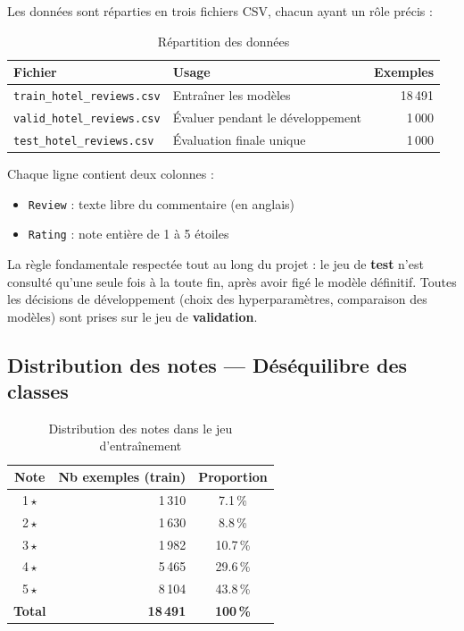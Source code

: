 \documentclass[12pt, a4paper]{article}
\begin{document}
Les données sont réparties en trois fichiers CSV, chacun ayant un rôle précis :

\begin{table}[H]
  \centering
  \begin{tabular}{llr}
    \toprule
    \textbf{Fichier} & \textbf{Usage} & \textbf{Exemples} \\
    \midrule
    \texttt{train\_hotel\_reviews.csv} & Entraîner les modèles & 18\,491 \\
    \texttt{valid\_hotel\_reviews.csv} & Évaluer pendant le développement & 1\,000 \\
    \texttt{test\_hotel\_reviews.csv}  & Évaluation finale unique & 1\,000 \\
    \bottomrule
  \end{tabular}
  \caption{Répartition des données}
\end{table}

Chaque ligne contient deux colonnes :
\begin{itemize}
  \item \texttt{Review} : texte libre du commentaire (en anglais)
  \item \texttt{Rating} : note entière de 1 à 5 étoiles
\end{itemize}

La règle fondamentale respectée tout au long du projet : le jeu de \textbf{test} n'est
consulté qu'une seule fois à la toute fin, après avoir figé le modèle définitif.
Toutes les décisions de développement (choix des hyperparamètres, comparaison des modèles)
sont prises sur le jeu de \textbf{validation}.

\subsection{Distribution des notes — Déséquilibre des classes}

\begin{table}[H]
  \centering
  \begin{tabular}{crc}
    \toprule
    \textbf{Note} & \textbf{Nb exemples (train)} & \textbf{Proportion} \\
    \midrule
    1\,$\star$ & 1\,310 &  7.1\,\% \\
    2\,$\star$ & 1\,630 &  8.8\,\% \\
    3\,$\star$ & 1\,982 & 10.7\,\% \\
    4\,$\star$ & 5\,465 & 29.6\,\% \\
    5\,$\star$ & 8\,104 & 43.8\,\% \\
    \midrule
    \textbf{Total} & \textbf{18\,491} & \textbf{100\,\%} \\
    \bottomrule
  \end{tabular}
  \caption{Distribution des notes dans le jeu d'entraînement}
\end{table}
\end{document}

